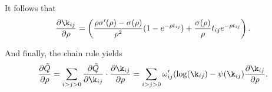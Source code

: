 \documentclass[12pt,leqno]{article}
\begin{document}




It follows that
\begin{equation}\label{dk_hat_drho}
    \frac{\partial\k_{ij}}{\partial\rho} = \left(\frac{\rho\sigma'(\rho) - \sigma(\rho)}{\rho^2}(1-e^{-\rho t_{ij}}) +
    \frac{\sigma(\rho)}{\rho}t_{ij}e^{-\rho t_{ij}}\right).
\end{equation}

And finally, the chain rule yields
\begin{equation}\label{dQ_drho}
  \frac{\partial\tilde{Q}}{\partial\rho} = \sum_{i>j>0}\frac{\partial\tilde{Q}}{\partial\k_{ij}}\cdot
  \frac{\partial\k_{ij}}{\partial\rho} =
  \sum_{i>j>0}\omega'_{ij}(\log(\k_{ij}) - \psi(\k_{ij})\frac{\partial\k_{ij}}{\partial\rho}.
\end{equation}
\end{document}
